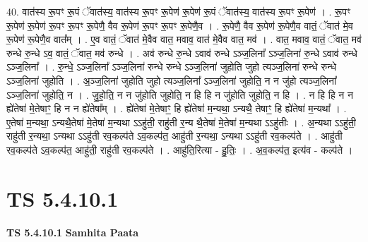 \documentclass[17pt]{extarticle}
\begin{document}
40. वात॑स्य रू॒पꣳ रू॒पं ॅवात॑स्य॒ वात॑स्य रू॒पꣳ रू॒पेण॑ रू॒पेण॑ रू॒पं ॅवात॑स्य॒ वात॑स्य रू॒पꣳ रू॒पेण॑ । . रू॒पꣳ रू॒पेण॑ रू॒पेण॑ रू॒पꣳ रू॒पꣳ रू॒पेणै॒ वैव रू॒पेण॑ रू॒पꣳ रू॒पꣳ रू॒पेणै॒व । . रू॒पेणै॒ वैव रू॒पेण॑ रू॒पेणै॒व वातं॒ ॅवात॑ मे॒व रू॒पेण॑ रू॒पेणै॒व वात᳚म् । . ए॒व वातं॒ ॅवात॑ मे॒वैव वात॒ मवाव॒ वात॑ मे॒वैव वात॒ मव॑ । . वात॒ मवाव॒ वातं॒ ॅवात॒ मव॑ रुन्धे रु॒न्धे ऽव॒ वातं॒ ॅवात॒ मव॑ रुन्धे । . अव॑ रुन्धे रु॒न्धे ऽवाव॑ रुन्धे ऽञ्ज॒लिना᳚ ऽञ्ज॒लिना॑ रु॒न्धे ऽवाव॑ रुन्धे ऽञ्ज॒लिना᳚ । . रु॒न्धे॒ ऽञ्ज॒लिना᳚ ऽञ्ज॒लिना॑ रुन्धे रुन्धे ऽञ्ज॒लिना॑ जुहोति जुहो त्यञ्ज॒लिना॑ रुन्धे रुन्धे ऽञ्ज॒लिना॑ जुहोति । . अ॒ञ्ज॒लिना॑ जुहोति जुहो त्यञ्ज॒लिना᳚ ऽञ्ज॒लिना॑ जुहोति॒ न न जु॑हो त्यञ्ज॒लिना᳚ ऽञ्ज॒लिना॑ जुहोति॒ न । . जु॒हो॒ति॒ न न जु॑होति जुहोति॒ न हि हि न जु॑होति जुहोति॒ न हि । . न हि हि न न ह्ये॑तेषा॑ मे॒तेषाꣳ॒॒ हि न न ह्ये॑तेषा᳚म् । . ह्ये॑तेषा॑ मे॒तेषाꣳ॒॒ हि ह्ये॑तेषा॑ म॒न्यथा॒ ऽन्यथै॒ तेषाꣳ॒॒ हि ह्ये॑तेषा॑ म॒न्यथा᳚ । . ए॒तेषा॑ म॒न्यथा॒ ऽन्यथै॒तेषा॑ मे॒तेषा॑ म॒न्यथा ऽऽहु॑ती॒ राहु॑ती र॒न्य थै॒तेषा॑ मे॒तेषा॑ म॒न्यथा ऽऽहु॑तीः । . अ॒न्यथा ऽऽहु॑ती॒ राहु॑ती र॒न्यथा॒ ऽन्यथा ऽऽहु॑ती रव॒कल्प॑ते ऽव॒कल्प॑त॒ आहु॑ती र॒न्यथा॒ ऽन्यथा ऽऽहु॑ती रव॒कल्प॑ते । . आहु॑ती रव॒कल्प॑ते ऽव॒कल्प॑त॒ आहु॑ती॒ राहु॑ती रव॒कल्प॑ते । . आहु॑ति॒रित्या - हु॒तिः॒ । . अ॒व॒कल्प॑त॒ इत्य॑व - कल्प॑ते । \newline
\pagebreak
{}

\section{ TS 5.4.10.1 }

\textbf{TS 5.4.10.1 } \newline
\textbf{Samhita Paata} \newline
\end{document}
